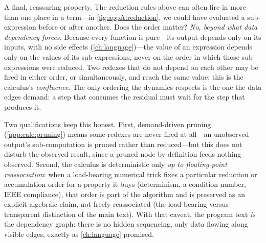A final, reassuring property. The reduction rules above can often fire in more
than one place in a term---in \cref{fig:appA:reduction}, we could have evaluated a
sub-expression before or after another. Does the order matter? \emph{No, beyond
what data dependency forces.} Because every function is pure---its output depends
only on its inputs, with no side effects (\cref{ch:language})---the value of an
expression depends only on the values of its sub-expressions, never on the order
in which those sub-expressions were reduced. Two redexes that do not depend on
each other may be fired in either order, or simultaneously, and reach the same
value; this is the calculus's \emph{confluence}. The only ordering the dynamics
respects is the one the data edges demand: a step that consumes the residual must
wait for the step that produces it.

Two qualifications keep this honest. First, demand-driven pruning
(\cref{app:calc:pruning}) means some redexes are never fired at all---an unobserved
output's sub-computation is pruned rather than reduced---but this does not disturb
the observed result, since a pruned node by definition feeds nothing observed.
Second, the calculus is deterministic only \emph{up to floating-point
reassociation}: when a load-bearing numerical trick fixes a particular reduction
or accumulation order for a property it buys (determinism, a condition number, IEEE
compliance), that order is part of the algorithm and is preserved as an explicit
algebraic claim, not freely reassociated (the load-bearing-versus-transparent
distinction of the main text). With that caveat, the program text \emph{is} the
dependency graph: there is no hidden sequencing, only data flowing along visible
edges, exactly as \cref{ch:language} promised.

